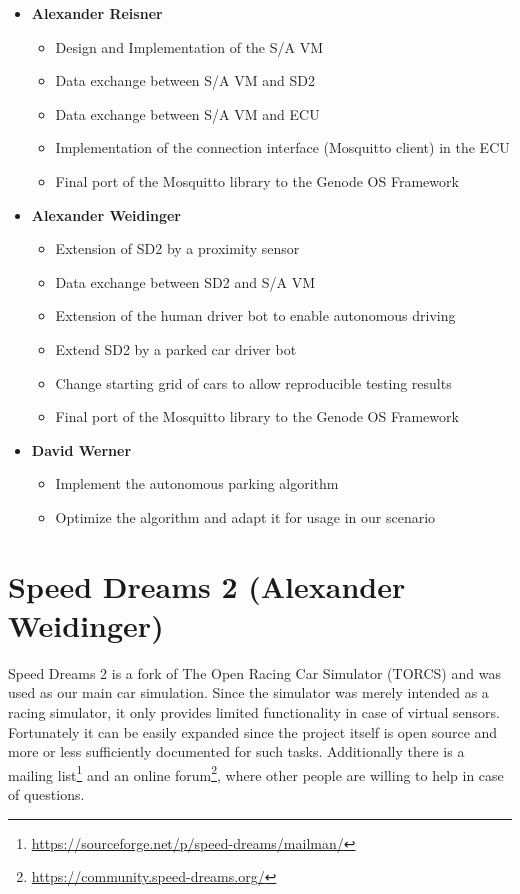 \documentclass[paper=a4, fontsize=11pt]{scrreprt}
\begin{document}
\begin{itemize}
  \item \textbf{Alexander Reisner}
  \begin{itemize}
    \item Design and Implementation of the S/A VM
    \item Data exchange between S/A VM and SD2
    \item Data exchange between S/A VM and ECU
    \item Implementation of the connection interface (Mosquitto client) in the ECU
    \item Final port of the Mosquitto library to the Genode OS Framework
  \end{itemize}
  \item \textbf{Alexander Weidinger}
  \begin{itemize}
    \item Extension of SD2 by a proximity sensor
    \item Data exchange between SD2 and S/A VM
    \item Extension of the human driver bot to enable autonomous driving
    \item Extend SD2 by a parked car driver bot
    \item Change starting grid of cars to allow reproducible testing results
    \item Final port of the Mosquitto library to the Genode OS Framework
  \end{itemize}
  \item \textbf{David Werner}
  \begin{itemize}
    \item Implement the autonomous parking algorithm
    \item Optimize the algorithm and adapt it for usage in our scenario
  \end{itemize}
\end{itemize}

\chapter{Speed Dreams 2 (Alexander Weidinger)}
Speed Dreams 2 is a fork of The Open Racing Car Simulator (TORCS)
and was used as our main car simulation.
Since the simulator was merely intended as a racing simulator,
it only provides limited functionality in case of virtual sensors.
Fortunately it can be easily expanded since the project itself is open source
and more or less sufficiently documented for such tasks.
Additionally there is a mailing list\footnote{\url{https://sourceforge.net/p/speed-dreams/mailman/}}
and an online forum\footnote{\url{https://community.speed-dreams.org/}},
where other people are willing to help in case of questions.
\end{document}
